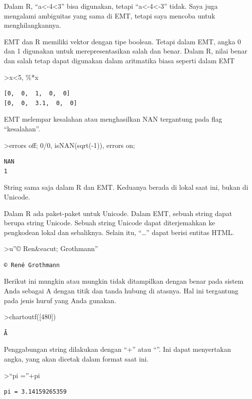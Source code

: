 \documentclass[
]{book}
\begin{document}
Dalam R, ``a\textless-4\textless3'' bisa digunakan, tetapi ``a\textless-4\textless-3'' tidak. Saya juga mengalami ambiguitas yang sama di EMT, tetapi saya mencoba untuk menghilangkannya.

EMT dan R memiliki vektor dengan tipe boolean. Tetapi dalam EMT, angka 0 dan 1 digunakan untuk merepresentasikan salah dan benar. Dalam R, nilai benar dan salah tetap dapat digunakan dalam aritmatika biasa seperti dalam EMT

\textgreater x\textless5, \%*x

\begin{verbatim}
[0,  0,  1,  0,  0]
[0,  0,  3.1,  0,  0]
\end{verbatim}

EMT melempar kesalahan atau menghasilkan NAN tergantung pada flag ``kesalahan''.

\textgreater errors off; 0/0, isNAN(sqrt(-1)), errors on;

\begin{verbatim}
NAN
1
\end{verbatim}

String sama saja dalam R dan EMT. Keduanya berada di lokal saat ini, bukan di Unicode.

Dalam R ada paket-paket untuk Unicode. Dalam EMT, sebuah string dapat berupa string Unicode. Sebuah string Unicode dapat diterjemahkan ke pengkodean lokal dan sebaliknya. Selain itu, ``\ldots{}'' dapat berisi entitas HTML.

\textgreater u''© Ren\&eacut; Grothmann''

\begin{verbatim}
© René Grothmann
\end{verbatim}

Berikut ini mungkin atau mungkin tidak ditampilkan dengan benar pada sistem Anda sebagai A dengan titik dan tanda hubung di atasnya. Hal ini tergantung pada jenis huruf yang Anda gunakan.

\textgreater chartoutf({[}480{]})

\begin{verbatim}
Ǡ
\end{verbatim}

Penggabungan string dilakukan dengan ``+'' atau ``\textbar{}''. Ini dapat menyertakan angka, yang akan dicetak dalam format saat ini.

\textgreater{}``pi =''+pi

\begin{verbatim}
pi = 3.14159265359
\end{verbatim}
\end{document}
